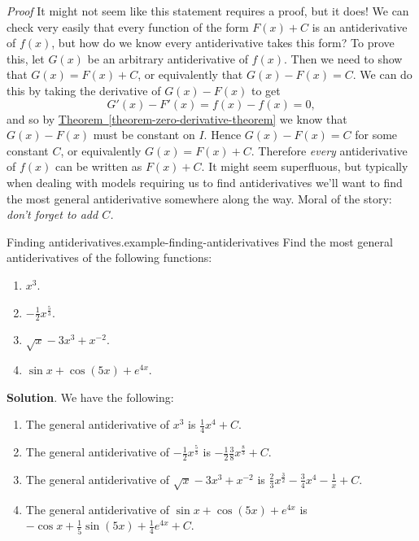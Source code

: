 \documentclass[10pt,]{book}
\makeatletter
\renewcommand*{\proofname}{Proof}
\renewenvironment{proof}[1][\proofname]{\par
  \pushQED{\qed}%
  \normalfont \topsep6\p@\@plus6\p@\relax
  \trivlist
  \item\relax
    {\itshape
    #1\@addpunct{.}}\hspace\labelsep\ignorespaces
}{%
  \popQED\endtrivlist\@endpefalse
}
\numberwithin{equation}{section}
\makeatother
\begin{document}
\begin{proof}\hypertarget{proof-9}{}
\hypertarget{p-383}{}%
It might not seem like this statement requires a proof, but it does! We can check very easily that every function of the form \(F(x)+C\) is an antiderivative of \(f(x)\), but how do we know every antiderivative takes this form? To prove this, let \(G(x)\) be an arbitrary antiderivative of \(f(x)\). Then we need to show that \(G(x) = F(x) + C\), or equivalently that \(G(x) - F(x) = C\). We can do this by taking the derivative of \(G(x) - F(x)\) to get%
\begin{equation*}
G'(x) - F'(x) = f(x) - f(x) = 0,
\end{equation*}
and so by \hyperref[theorem-zero-derivative-theorem]{Theorem~\ref{theorem-zero-derivative-theorem}} we know that \(G(x) - F(x)\) must be constant on \(I\). Hence \(G(x) - F(x) = C\) for some constant \(C\), or equivalently \(G(x) = F(x)+C\). Therefore \emph{every} antiderivative of \(f(x)\) can be written as \(F(x) + C\).%
\end{proof}
\hypertarget{p-384}{}%
It might seem superfluous, but typically when dealing with models requiring us to find antiderivatives we'll want to find the most general antiderivative somewhere along the way. Moral of the story: \emph{don't forget to add \(C\).}%
\begin{example}{Finding antiderivatives.}{example-finding-antiderivatives}%
\hypertarget{p-385}{}%
Find the most general antiderivatives of the following functions: \leavevmode%
\begin{enumerate}
\item\hypertarget{li-28}{}\(x^{3}.\)%
\item\hypertarget{li-29}{}\(-\frac{1}{2}x^{\frac{5}{3}}.\)%
\item\hypertarget{li-30}{}\(\sqrt{x} - 3x^{3} + x^{-2}.\)%
\item\hypertarget{li-31}{}\(\sin x + \cos (5x) + e^{4x}.\)%
\end{enumerate}
%
\par\smallskip%
\noindent\textbf{Solution}.\hypertarget{solution-85}{}\quad%
\hypertarget{p-386}{}%
We have the following: \leavevmode%
\begin{enumerate}
\item\hypertarget{li-32}{}The general antiderivative of \(x^{3}\) is \(\frac{1}{4}x^{4}+C.\)%
\item\hypertarget{li-33}{}The general antiderivative of \(-\frac{1}{2}x^{\frac{5}{3}}\) is \(-\frac{1}{2}\frac{3}{8}x^{\frac{8}{3}}+C.\)%
\item\hypertarget{li-34}{}The general antiderivative of \(\sqrt{x} - 3x^{3} + x^{-2}\) is \(\frac{2}{3}x^{\frac{3}{2}} - \frac{3}{4}x^{4} - \frac{1}{x} + C\).%
\item\hypertarget{li-35}{}The general antiderivative of \(\sin x + \cos (5x) + e^{4x}\) is \(-\cos x + \frac{1}{5}\sin(5x) + \frac{1}{4}e^{4x} + C.\)%
\end{enumerate}
%
\end{example}
\end{document}
